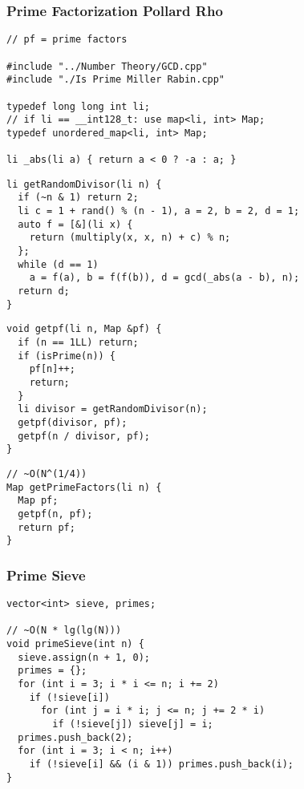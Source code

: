 \documentclass[twoside]{article}
\begin{document}
\begin{multicols*}{2}
\subsubsectionfont{\large\bfseries\sffamily\underline}
\subsubsection*{Prime Factorization Pollard Rho}
\begin{verbatim}
// pf = prime factors

#include "../Number Theory/GCD.cpp"
#include "./Is Prime Miller Rabin.cpp"

typedef long long int li;
// if li == __int128_t: use map<li, int> Map;
typedef unordered_map<li, int> Map;

li _abs(li a) { return a < 0 ? -a : a; }
\end{verbatim}
\vspace{-12pt}
\begin{verbatim}
li getRandomDivisor(li n) {
  if (~n & 1) return 2;
  li c = 1 + rand() % (n - 1), a = 2, b = 2, d = 1;
  auto f = [&](li x) {
    return (multiply(x, x, n) + c) % n;
  };
  while (d == 1)
    a = f(a), b = f(f(b)), d = gcd(_abs(a - b), n);
  return d;
}
\end{verbatim}
\vspace{-12pt}
\begin{verbatim}
void getpf(li n, Map &pf) {
  if (n == 1LL) return;
  if (isPrime(n)) {
    pf[n]++;
    return;
  }
  li divisor = getRandomDivisor(n);
  getpf(divisor, pf);
  getpf(n / divisor, pf);
}
\end{verbatim}
\vspace{-12pt}
\begin{verbatim}
// ~O(N^(1/4))
Map getPrimeFactors(li n) {
  Map pf;
  getpf(n, pf);
  return pf;
}
\end{verbatim}

\subsubsectionfont{\large\bfseries\sffamily\underline}
\subsubsection*{Prime Sieve}
\begin{verbatim}
vector<int> sieve, primes;

// ~O(N * lg(lg(N)))
void primeSieve(int n) {
  sieve.assign(n + 1, 0);
  primes = {};
  for (int i = 3; i * i <= n; i += 2)
    if (!sieve[i])
      for (int j = i * i; j <= n; j += 2 * i)
        if (!sieve[j]) sieve[j] = i;
  primes.push_back(2);
  for (int i = 3; i < n; i++)
    if (!sieve[i] && (i & 1)) primes.push_back(i);
}
\end{verbatim}


\end{multicols*}
\end{document}
